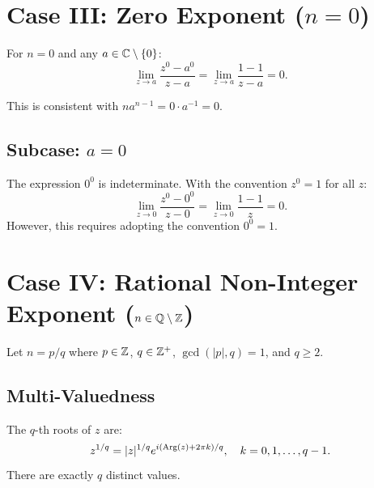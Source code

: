 \section{Case III: Zero Exponent ($n = 0$)}

\begin{proposition}
For $n = 0$ and any $a \in \mathbb{C} \setminus \{0\}$:
\begin{equation}
\lim_{z \to a} \frac{z^0 - a^0}{z - a} = \lim_{z \to a} \frac{1 - 1}{z - a} = 0.
\end{equation}
\end{proposition}

\begin{remark}
This is consistent with $n a^{n-1} = 0 \cdot a^{-1} = 0$.
\end{remark}

\subsection{Subcase: $a = 0$}

\begin{warning}
The expression $0^0$ is indeterminate. With the convention $z^0 = 1$ for all $z$:
\begin{equation}
\lim_{z \to 0} \frac{z^0 - 0^0}{z - 0} = \lim_{z \to 0} \frac{1 - 1}{z} = 0.
\end{equation}
However, this requires adopting the convention $0^0 = 1$.
\end{warning}

\section{Case IV: Rational Non-Integer Exponent ($n \in \mathbb{Q} \setminus \mathbb{Z}$)}

Let $n = p/q$ where $p \in \mathbb{Z}$, $q \in \mathbb{Z}^+$, $\gcd(|p|, q) = 1$, and $q \geq 2$.

\subsection{Multi-Valuedness}

\begin{definition}
The $q$-th roots of $z$ are:
\begin{equation}
z^{1/q} = |z|^{1/q} e^{i(\operatorname{Arg}(z) + 2\pi k)/q}, \quad k = 0, 1, \ldots, q-1.
\end{equation}
There are exactly $q$ distinct values.
\end{definition}


